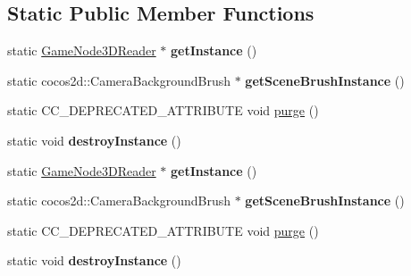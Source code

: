 \subsection*{Static Public Member Functions}
\begin{DoxyCompactItemize}
\item 
\mbox{\label{classcocostudio_1_1GameNode3DReader_af09f6c4c14dca19b463a8222b2aeca63}} 
static \hyperlink{classcocostudio_1_1GameNode3DReader}{Game\+Node3\+D\+Reader} $\ast$ {\bfseries get\+Instance} ()
\item 
\mbox{\label{classcocostudio_1_1GameNode3DReader_a41625790d5ecfd3426c7ef02088a7c5f}} 
static cocos2d\+::\+Camera\+Background\+Brush $\ast$ {\bfseries get\+Scene\+Brush\+Instance} ()
\item 
static C\+C\+\_\+\+D\+E\+P\+R\+E\+C\+A\+T\+E\+D\+\_\+\+A\+T\+T\+R\+I\+B\+U\+TE void \hyperlink{classcocostudio_1_1GameNode3DReader_a3d35fe546c6f1b8293d4d61a020077c1}{purge} ()
\item 
\mbox{\label{classcocostudio_1_1GameNode3DReader_a2092eebfe0c109165b3deff03ceaf4e2}} 
static void {\bfseries destroy\+Instance} ()
\item 
\mbox{\label{classcocostudio_1_1GameNode3DReader_a4b80063a7d952714492697e198904b7c}} 
static \hyperlink{classcocostudio_1_1GameNode3DReader}{Game\+Node3\+D\+Reader} $\ast$ {\bfseries get\+Instance} ()
\item 
\mbox{\label{classcocostudio_1_1GameNode3DReader_a1568a6ecb1130a345bb884ad21f7b78e}} 
static cocos2d\+::\+Camera\+Background\+Brush $\ast$ {\bfseries get\+Scene\+Brush\+Instance} ()
\item 
static C\+C\+\_\+\+D\+E\+P\+R\+E\+C\+A\+T\+E\+D\+\_\+\+A\+T\+T\+R\+I\+B\+U\+TE void \hyperlink{classcocostudio_1_1GameNode3DReader_a30a866505d94a69961443e6803bb2c0e}{purge} ()
\item 
\mbox{\label{classcocostudio_1_1GameNode3DReader_acb651304eacb2f3e4c8f6a7ba7bcc084}} 
static void {\bfseries destroy\+Instance} ()
\end{DoxyCompactItemize}
